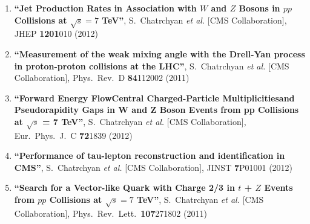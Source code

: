 \begin{enumerate}
\item%
{\bf ``Jet Production Rates in Association with $W$ and $Z$ Bosons in $pp$ Collisions at $\sqrt{s}=7$ TeV''}, 
  S.~Chatrchyan {\it et al.}  [CMS Collaboration], 
JHEP {\bf 1201}010 (2012) %


\item%
{\bf ``Measurement of the weak mixing angle with the Drell-Yan process in proton-proton collisions at the LHC''}, 
  S.~Chatrchyan {\it et al.}  [CMS Collaboration], 
Phys.\ Rev.\ D {\bf 84}112002 (2011) %


\item%
{\bf ``Forward Energy FlowCentral Charged-Particle Multiplicitiesand Pseudorapidity Gaps in W and Z Boson Events from pp Collisions at $\sqrt{s}$ = 7 TeV''}, 
  S.~Chatrchyan {\it et al.}  [CMS Collaboration], 
Eur.\ Phys.\ J.\ C {\bf 72}1839 (2012) %


\item%
{\bf ``Performance of tau-lepton reconstruction and identification in CMS''}, 
  S.~Chatrchyan {\it et al.}  [CMS Collaboration], 
JINST {\bf 7}P01001 (2012) %


\item%
{\bf ``Search for a Vector-like Quark with Charge 2/3 in $t$ + $Z$ Events from $pp$ Collisions at $\sqrt{s}=7$ TeV''}, 
  S.~Chatrchyan {\it et al.}  [CMS Collaboration], 
Phys.\ Rev.\ Lett.\  {\bf 107}271802 (2011) %



\end{enumerate}
